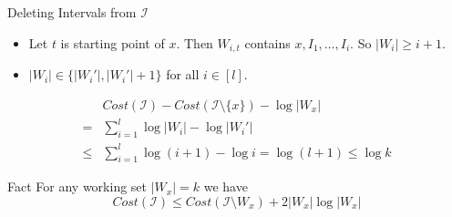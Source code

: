 \documentclass[10pt]{beamer}
\begin{document}
\begin{frame}{Deleting Intervals from $\mathcal{I}$}
	\begin{itemize}
		\item Let $t$ is starting point of $x$. Then $W_{i,t}$ contains $x, I_1,\dots, I_i$. So $|W_i|\geq i+1$.
		\item $|W_i|\in\{|W_i'|,|W_i'|+1\}$ for all $i\in[l]$.
	\end{itemize}
	\begin{align*}
		     & Cost(\mathcal{I})-Cost(\mathcal{I}\setminus \{x\})-\log |W_x| \\
		=    & \sum\limits_{i=1}^l \log|W_i|-\log|W_i'|                      \\
		\leq & \sum\limits_{i=1}^l \log(i+1)-\log i =\log (l+1) \leq \log k
	\end{align*}

	\begin{alertblock}{Fact}
		For any working set $|W_x|=k$ we have $$Cost(\mathcal{I})\leq Cost(\mathcal{I}\setminus W_x)+2|W_x|\log |W_x|$$
	\end{alertblock}
\end{frame}
\end{document}
